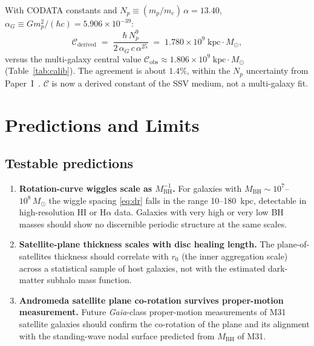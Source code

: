\documentclass[11pt,a4paper]{article}
\begin{document}
\begin{resultbox}
With CODATA constants and $N_p \equiv (m_p/m_e)\,\alpha = 13.40$,
$\alpha_G \equiv G m_p^2/(\hbar c) = 5.906\times10^{-39}$:
\begin{equation*}
  \mathcal{C}_\mathrm{derived}
    \;=\; \frac{\hbar\,N_p^9}{2\,\alpha_G\,c\,\alpha^{25}}
    \;=\; 1.780\times10^{9}\;\mathrm{kpc}\cdot M_\odot,
\end{equation*}
versus the multi-galaxy central value $\mathcal{C}_\mathrm{obs} \approx
1.806\times10^{9}\;\mathrm{kpc}\cdot M_\odot$ (Table~\ref{tab:calib}).  The
agreement is about $1.4\%$, within the $N_p$ uncertainty from
Paper~I~\cite{SSV-I}.  $\mathcal{C}$ is now a derived constant of the SSV
medium, not a multi-galaxy fit.
\end{resultbox}

\section{Predictions and Limits}
\label{sec:predictions}

\subsection{Testable predictions}

\begin{enumerate}
  \item \textbf{Rotation-curve wiggles scale as $M_\mathrm{BH}^{-1}$.}
    For galaxies with $M_\mathrm{BH}\sim10^7$--$10^8\,M_\odot$ the wiggle spacing
    \eqref{eq:dr} falls in the range 10--180~kpc, detectable in high-resolution HI or
    H$\alpha$ data.  Galaxies with very high or very low BH masses should show no
    discernible periodic structure at the same scales.

  \item \textbf{Satellite-plane thickness scales with disc healing length.}
    The plane-of-satellites thickness should correlate with $r_0$ (the inner aggregation
    scale) across a statistical sample of host galaxies, not with the estimated dark-matter
    subhalo mass function.

  \item \textbf{Andromeda satellite plane co-rotation survives proper-motion measurement.}
    Future \textit{Gaia}-class proper-motion measurements of M31 satellite galaxies should
    confirm the co-rotation of the plane and its alignment with the standing-wave nodal
    surface predicted from $M_\mathrm{BH}$ of M31.
\end{enumerate}
\end{document}

